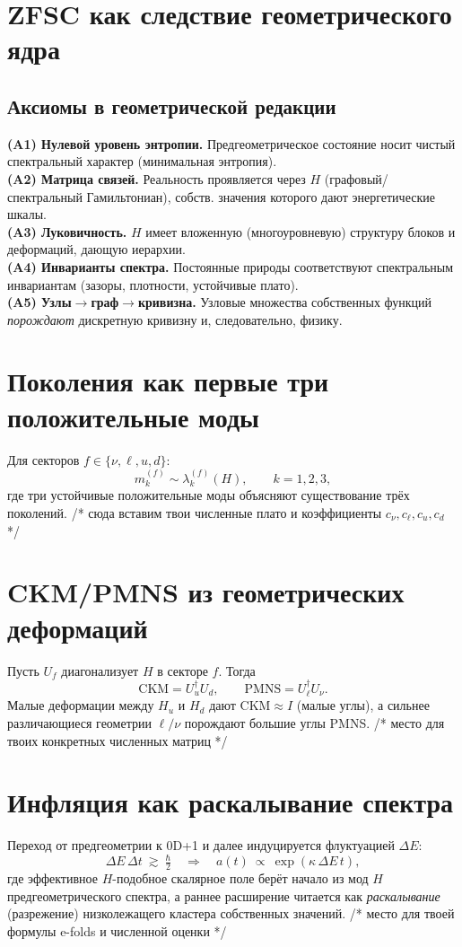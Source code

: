 \documentclass[12pt,a4paper]{article}
\begin{document}
\section{ZFSC как следствие геометрического ядра}
\subsection{Аксиомы в геометрической редакции}
\textbf{(A1) Нулевой уровень энтропии.} Предгеометрическое состояние носит чистый спектральный характер (минимальная энтропия).\\
\textbf{(A2) Матрица связей.} Реальность проявляется через $H$ (графовый/спектральный Гамильтониан), собств. значения которого дают энергетические шкалы.\\
\textbf{(A3) Луковичность.} $H$ имеет вложенную (многоуровневую) структуру блоков и деформаций, дающую иерархии.\\
\textbf{(A4) Инварианты спектра.} Постоянные природы соответствуют спектральным инвариантам (зазоры, плотности, устойчивые плато).\\
\textbf{(A5) Узлы$\to$граф$\to$кривизна.} Узловые множества собственных функций \emph{порождают} дискретную кривизну и, следовательно, физику.

\section{Поколения как первые три положительные моды}
Для секторов $f\in\{\nu,\ell,u,d\}$:
\[
m^{(f)}_k \sim \lambda^{(f)}_k(H),\qquad k=1,2,3,
\]
где три устойчивые положительные моды объясняют существование трёх поколений. 
/* сюда вставим твои численные плато и коэффициенты $c_\nu,c_\ell,c_u,c_d$ */

\section{CKM/PMNS из геометрических деформаций}
Пусть $U_f$ диагонализует $H$ в секторе $f$. Тогда
\[
\mathrm{CKM}=U_u^\dagger U_d,\qquad \mathrm{PMNS}=U_\ell^\dagger U_\nu.
\]
Малые деформации между $H_u$ и $H_d$ дают CKM$\approx I$ (малые углы), 
а сильнее различающиеся геометрии $\ell/\nu$ порождают большие углы PMNS.
/* место для твоих конкретных численных матриц */

\section{Инфляция как раскалывание спектра}
Переход от предгеометрии к 0D+1 и далее индуцируется флуктуацией $\Delta E$:
\[
\Delta E\,\Delta t\ \gtrsim\ \tfrac{\hbar}{2}\quad\Rightarrow\quad 
a(t)\ \propto\ \exp\!\left(\kappa\,\Delta E\, t\right),
\]
где эффективное $H$-подобное скалярное поле берёт начало из мод $H$ предгеометрического спектра, а раннее расширение читается как \emph{раскалывание} (разрежение) низколежащего кластера собственных значений.
/* место для твоей формулы e-folds и численной оценки */
\end{document}
